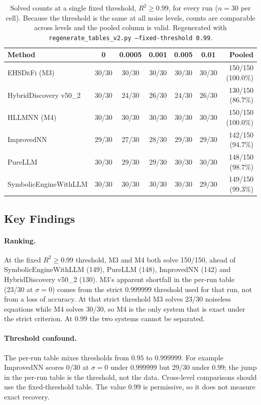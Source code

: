 \documentclass[twoside,11pt]{article}
\newcommand{\EHD}{\textsc{EHSDeFi}}
\newcommand{\HSL}{\textsc{HLLMNN}}
\newcommand{\Rsq}{R^{2}}
\begin{document}
\begin{table}[H]
\centering
\caption{Solved counts at a single fixed threshold, $\Rsq\geq0.99$, for every
  run ($n=30$ per cell). Because the threshold is the same at all noise levels,
  counts are comparable across levels and the pooled column is valid.
  Regenerated with \texttt{regenerate\_tables\_v2.py --fixed-threshold 0.99}.}
\label{tab:noise_sensitivity_fixed}
\small
\setlength{\tabcolsep}{4pt}
\begin{tabular}{@{}l c c c c c r@{}}
\toprule
\textbf{Method} & \textbf{0} & \textbf{0.0005} & \textbf{0.001} & \textbf{0.005} & \textbf{0.01} & \textbf{Pooled}\\
\midrule
\EHD{} (M3)            & 30/30 & 30/30 & 30/30 & 30/30 & 30/30 & 150/150 (100.0\%)\\
HybridDiscovery v50\_2 & 30/30 & 24/30 & 26/30 & 24/30 & 26/30 & 130/150 (86.7\%)\\
\HSL{} (M4)            & 30/30 & 30/30 & 30/30 & 30/30 & 30/30 & 150/150 (100.0\%)\\
ImprovedNN             & 29/30 & 27/30 & 28/30 & 29/30 & 29/30 & 142/150 (94.7\%)\\
PureLLM                & 30/30 & 29/30 & 29/30 & 30/30 & 30/30 & 148/150 (98.7\%)\\
SymbolicEngineWithLLM  & 30/30 & 30/30 & 30/30 & 30/30 & 29/30 & 149/150 (99.3\%)\\
\bottomrule
\end{tabular}
\end{table}

\subsection{Key Findings}

\paragraph{Ranking.} At the fixed $\Rsq\geq0.99$ threshold, M3 and M4 both solve
150/150, ahead of SymbolicEngineWithLLM (149), PureLLM (148), ImprovedNN (142)
and HybridDiscovery v50\_2 (130). M3's apparent shortfall in the per-run table
(23/30 at $\sigma=0$) comes from the strict $0.999999$ threshold used for that
run, not from a loss of accuracy. At that strict threshold M3 solves 23/30
noiseless equations while M4 solves 30/30, so M4 is the only system that is exact
under the strict criterion. At $0.99$ the two systems cannot be separated.

\paragraph{Threshold confound.} The per-run table mixes thresholds from $0.95$ to
$0.999999$. For example ImprovedNN scores 0/30 at $\sigma=0$ under $0.999999$ but
29/30 under $0.99$; the jump in the per-run table is the threshold, not the
data. Cross-level comparisons should use the fixed-threshold table. The value
$0.99$ is permissive, so it does not measure exact recovery.
\end{document}
